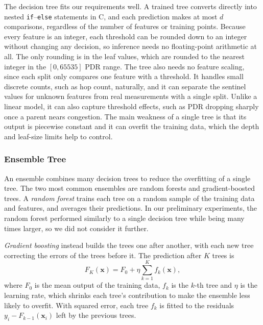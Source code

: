 The decision tree fits our requirements well. A trained tree converts
directly into nested \texttt{if}--\texttt{else} statements in C, and
each prediction makes at most $d$ comparisons, regardless of the
number of features or training points. Because every feature is an
integer, each threshold can be rounded down to an integer without
changing any decision, so inference needs no floating-point
arithmetic at all. The only rounding is in the leaf values, which are
rounded to the nearest integer in the $[0, 65535]$ PDR range. The
tree also needs no feature scaling, since each split only compares
one feature with a threshold. It handles small discrete counts, such
as hop count, naturally, and it can separate the sentinel values for
unknown features from real measurements with a single split. Unlike
a linear model, it can also capture threshold effects, such as PDR
dropping sharply once a parent nears congestion. The main weakness of
a single tree is that its output is piecewise constant and it can
overfit the training data, which the depth and leaf-size limits help
to control.

\subsubsection{Ensemble Tree}
An ensemble combines many decision trees to reduce the overfitting of
a single tree. The two most common ensembles are random forests and
gradient-boosted trees. A \emph{random forest} trains each tree on a
random sample of the training data and features, and averages their
predictions. In our preliminary experiments, the random forest
performed similarly to a single decision tree while being many times
larger, so we did not consider it further.

\emph{Gradient boosting} instead builds the trees one after another,
with each new tree correcting the errors of the trees before it. The
prediction after $K$ trees is
\begin{equation}
    F_K(\mathbf{x}) = F_0 + \eta \sum_{k=1}^{K} f_k(\mathbf{x}),
\end{equation}
where $F_0$ is the mean output of the training data, $f_k$ is the
$k$-th tree and $\eta$ is the learning rate, which shrinks each
tree's contribution to make the ensemble less likely to overfit.
With squared error, each tree $f_k$ is fitted to the residuals
$y_i - F_{k-1}(\mathbf{x}_i)$ left by the previous trees.

